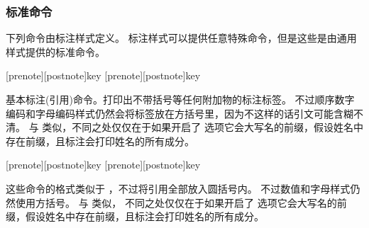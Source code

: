 \subsubsection{标准命令} %
\label{use:cit:std}


下列命令由标注样式定义。
标注样式可以提供任意特殊命令，但是这些是由通用样式提供的标准命令。

\begin{ltxsyntax}


[prenote][postnote]{key}
[prenote][postnote]{key}


基本标注(引用)命令。打印出不带括号等任何附加物的标注标签。
不过顺序数字编码和字母编码样式仍然会将标签放在方括号里，因为不这样的话引文可能含糊不清。
 与  类似，不同之处仅仅在于如果开启了  选项它会大写名的前缀，假设姓名中存在前缀，且标注会打印姓名的所有成分。

[prenote][postnote]{key}
[prenote][postnote]{key}


这些命令的格式类似于 ，不过将引用全部放入圆括号内。
不过数值和字母样式仍然使用方括号。 与  类似，
不同之处仅仅在于如果开启了  选项它会大写名的前缀，假设姓名中存在前缀，且标注会打印姓名的所有成分。


\end{ltxsyntax}
